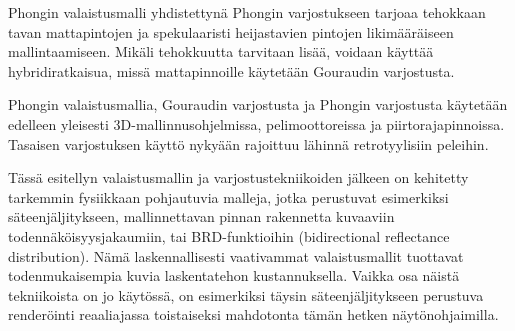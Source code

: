 \documentclass[finnish]{tktltiki2}
\theoremstyle{definition}
\theoremstyle{remark}
\begin{document}
Phongin valaistusmalli yhdistettynä Phongin varjostukseen tarjoaa tehokkaan tavan mattapintojen ja spekulaaristi heijastavien pintojen likimääräiseen mallintaamiseen. Mikäli tehokkuutta tarvitaan lisää, voidaan käyttää hybridiratkaisua, missä mattapinnoille käytetään Gouraudin varjostusta.

Phongin valaistusmallia, Gouraudin varjostusta ja Phongin varjostusta käytetään edelleen yleisesti 3D-mallinnusohjelmissa, pelimoottoreissa ja piirtorajapinnoissa. Tasaisen varjostuksen käyttö nykyään rajoittuu lähinnä retrotyylisiin peleihin.

Tässä esitellyn valaistusmallin ja varjostustekniikoiden jälkeen on kehitetty tarkemmin fysiikkaan pohjautuvia malleja, jotka perustuvat esimerkiksi säteenjäljitykseen, mallinnettavan pinnan rakennetta kuvaaviin todennäköisyysjakaumiin, tai BRD-funktioihin (bidirectional reflectance distribution). Nämä laskennallisesti vaativammat valaistusmallit tuottavat todenmukaisempia kuvia laskentatehon kustannuksella. Vaikka osa näistä tekniikoista on jo käytössä, on esimerkiksi täysin säteenjäljitykseen perustuva renderöinti reaaliajassa toistaiseksi mahdotonta tämän hetken näytönohjaimilla.

\newpage

%
%

%

%





% 
\end{document}
